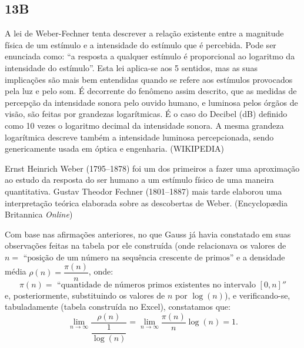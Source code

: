 {\subsection*{13B}


A lei de Weber-Fechner tenta descrever a relação existente entre a magnitude física de um estímulo e a intensidade do estímulo que é percebida. Pode ser enunciada como: ``a resposta a qualquer estímulo é proporcional ao logaritmo da intensidade do estímulo''. Esta lei aplica-se aos 5 sentidos, mas as suas implicações são mais bem entendidas quando se refere aos estímulos provocados pela luz e pelo som. É decorrente do fenômeno assim descrito, que as medidas de percepção da intensidade sonora pelo ouvido humano, e luminosa pelos órgãos de visão, são feitas por grandezas logarítmicas. É o caso do Decibel (dB) definido como 10 vezes o logaritmo decimal da intensidade sonora. A mesma grandeza logarítmica descreve também a intensidade luminosa percepcionada, sendo genericamente usada em óptica e engenharia. (WIKIPEDIA)

Ernst Heinrich Weber (1795–1878) foi um dos primeiros a fazer uma aproximação ao estudo da resposta do ser humano a um estímulo físico de uma maneira quantitativa. Gustav Theodor Fechner (1801–1887) mais tarde elaborou uma interpretação teórica elaborada sobre as descobertas de Weber. (Encyclopædia Britannica \textit{Online})


Com base nas afirmações anteriores, no que Gauss já havia constatado em suas observações feitas na tabela por ele construída (onde relacionava os valores de \(n = \mbox{ ``posição de um número na sequência crescente de primos''}\) e a densidade média \(\rho(n) = \dfrac{\pi(n)}{n}\), onde:
\[\pi(n) = \mbox{ ``quantidade de números primos existentes no intervalo } [0, n]''\]
e, posteriormente, substituindo os valores de \(n\) por \(\log(n)\)), e verificando-se, tabuladamente (tabela construída no Excel), constatamos que:
\[\displaystyle\lim_{n \to \infty} \dfrac{\rho(n)}{\dfrac{1}{\log(n)}} = \lim_{n \to \infty} \dfrac{\pi(n)}{n} \log(n) = 1.\]


}


